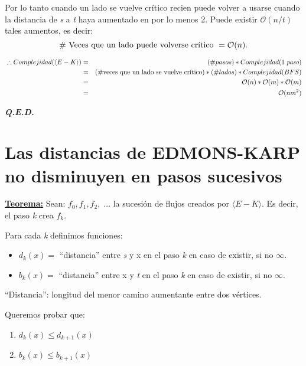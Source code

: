 \documentclass[12pt,a4paper]{report}
\newcommand{\QED}{\hfill \textit{\textbf{Q.E.D.}}}
\begin{document}
			\vspace{5mm}
			\par Por lo tanto cuando un lado se vuelve crítico recien puede volver a usarse cuando la distancia de \textit{s} a \textit{t} haya aumentado en por lo menos 2. Puede existir $\mathcal{O}(n/t)$ tales aumentos, es decir:
				\[ \# \textup{ Veces que un lado puede volverse crítico } = \mathcal{O}(n). \]

			\begin{eqnarray}
				\nonumber \; \therefore Complejidad(\langle E-K\rangle) &=& (\# pasos) * Complejidad(1 \; \textit{paso}) \\
				\nonumber &=& (\# \textup{veces que un lado se vuelve crítico}) * (\# lados) * Complejidad(BFS) \\
				\nonumber  &=& \mathcal{O}(n) * \mathcal{O}(m)* \mathcal{O}(m) \\
				\nonumber &=& \mathcal{O}(nm^{2})
			\end{eqnarray}

		\QED

	\pagebreak
	\section{Las distancias de EDMONS-KARP no disminuyen en pasos sucesivos}
		\textbf{\underline{Teorema:}} Sean: $f_{0}, f_{1}, f_{2}, \; \dotsc$ \; la sucesión de flujos creados por $\langle E-K\rangle$. Es decir, el paso \textit{k} crea $f_{k}$.

			\vspace{5mm}
			\par Para cada \textit{k} definimos funciones:

			\begin{itemize}
				\item $d_{k}(x) =$ \textquotedblleft distancia\textquotedblright \; entre \textit{s} y x en el paso \textit{k} en caso de existir, si no $\infty$.
				\item $b_{k}(x) =$ \textquotedblleft distancia\textquotedblright \; entre x y \textit{t} en el paso \textit{k} en caso de existir, si no $\infty$.
			\end{itemize}

			\textquotedblleft Distancia\textquotedblright: longitud del menor camino aumentante entre dos vértices.

			\vspace{5mm}
			\par Queremos probar que:
			\begin{enumerate}
				\item $d_{k}(x) \leq d_{k + 1}(x)$
				\item $b_{k}(x) \leq b_{k + 1}(x)$
			\end{enumerate}
\end{document}
